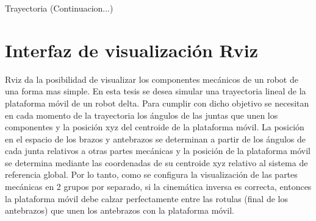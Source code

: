     \clearpage   
        
\begin{algorithm}
      \ContinuedFloat
      \caption{Trayectoria (Continuacion...)}
\end{algorithm}
    
        \newpage
    
    

    \newpage

\section{Interfaz de visualización Rviz}

    Rviz da la posibilidad de visualizar los componentes mecánicos de un robot de una forma mas simple. En esta tesis se desea simular una trayectoria lineal de la plataforma móvil de un robot delta. Para cumplir con dicho objetivo se necesitan en cada momento de la trayectoria los ángulos de las juntas que unen los componentes y la posición xyz del centroide de la plataforma móvil. La posición en el espacio de los brazos y antebrazos se determinan a partir de los ángulos de cada junta relativos a otras partes mecánicas y la posición de la plataforma móvil se determina mediante las coordenadas de su centroide xyz relativo al sistema de referencia global. Por lo tanto, como se configura la visualización de las partes mecánicas en 2 grupos por separado, si la cinemática inversa es correcta, entonces la plataforma móvil debe calzar perfectamente entre las rotulas (final de los antebrazos) que unen los antebrazos con la plataforma móvil.
     
